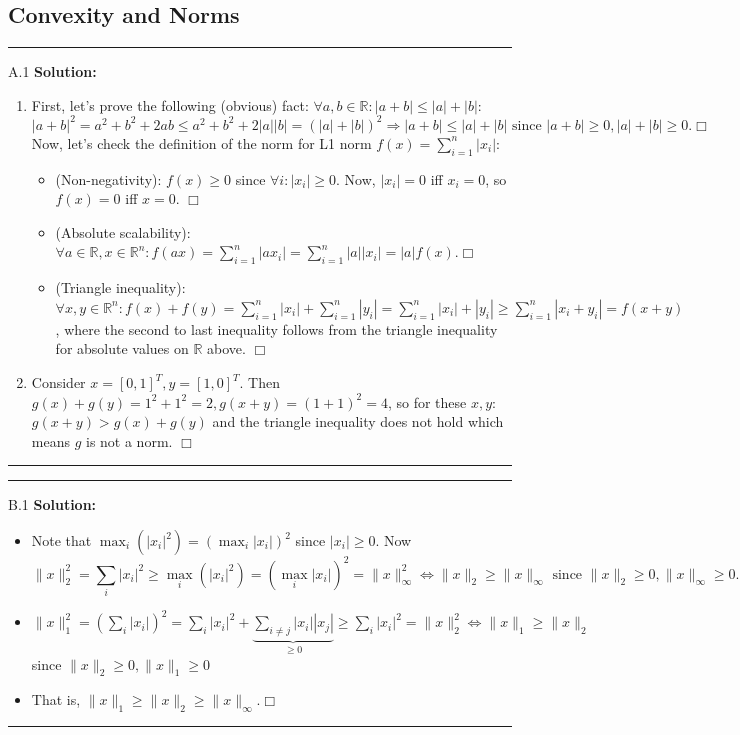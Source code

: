 \documentclass{article}
\newcommand{\field}[1]{\mathbb{#1}}
\newcommand{\1}{\mathbf{1}}
\newcommand{\R}{\field{R}} %
\begin{document}
\subsection*{Convexity and Norms}
\noindent\rule{\textwidth}{1pt}
A.1 {\bf Solution:}\\
\begin{enumerate}
    \item First, let's prove the following (obvious) fact: $\forall a,b \in \R: |a + b| \le |a| + |b|$:
    $$|a + b|^2 = a^2 + b^2 + 2ab \le a^2 + b^2 + 2|a||b| = (|a| + |b|)^2 \Rightarrow |a + b| \le |a| + |b| \text{  since  } |a + b|\ge 0, |a| + |b|\ge 0. \Box$$
    Now, let's check the definition of the norm for L1 norm $f(x) = \sum_{i=1}^n |x_i|$:
    \begin{itemize}
        \item (Non-negativity): $f(x) \ge 0$ since $\forall i: |x_i| \ge 0$. Now, $|x_i| = 0$ iff $x_i = 0$, so $f(x) = 0$ iff $x = 0$. $\Box$
        \item (Absolute scalability): $\forall a\in \R, x\in \R^n: f(ax) = \sum_{i=1}^n |ax_i| = \sum_{i=1}^n |a||x_i| = |a|f(x). \Box$
        \item (Triangle inequality): $\forall x,y \in \R^n: f(x) + f(y) = \sum_{i=1}^n |x_i| + \sum_{i=1}^n |y_i| = \sum_{i=1}^n |x_i| + |y_i| \ge \sum_{i=1}^n |x_i + y_i| = f(x+y)$, where the second to last inequality follows from the triangle inequality for absolute values on $\R$ above. $\Box$
    \end{itemize}
    \item Consider $x = [0, 1]^T, y = [1, 0]^T$. Then $g(x) + g(y) = 1^2 + 1^2 = 2, g(x+y) = (1 + 1)^2 = 4$, so for these $x,y$: $g(x+y) > g(x) + g(y)$ and the triangle inequality does not hold which means $g$ is not a norm. $\Box$
    
\end{enumerate}

\noindent\rule{\textwidth}{1pt}


\noindent\rule{\textwidth}{1pt}
B.1 {\bf Solution:}\\
\begin{itemize}
    \item Note that $\max_i (|x_i|^2) = (\max_i |x_i|)^2$ since $|x_i| \ge 0$. Now 
    $$
    \|x\|_2^2 = \sum_i|x_i|^2 \ge \max_i (|x_i|^2) = (\max_i |x_i|)^2 = \|x\|^2_{\infty} \Leftrightarrow \|x\|_2 \ge \|x\|_{\infty} \text{  since  } \|x\|_2\ge0, \|x\|_{\infty}\ge0.
    $$
    \item $\|x\|_1^2 = (\sum_i |x_i|)^2 = \sum_i |x_i|^2 + \underbrace{\sum_{i\not=j} |x_i||x_j|}_{\ge 0} \ge \sum_i |x_i|^2 = \|x\|_2^2 \Leftrightarrow \|x\|_1 \ge \|x\|_2$ since $\|x\|_2\ge0, \|x\|_1\ge0$
    \item That is, $\boxed{\|x\|_1 \ge \|x\|_2 \ge \|x\|_{\infty}. \Box}$
\end{itemize}
\noindent\rule{\textwidth}{1pt}
\end{document}
